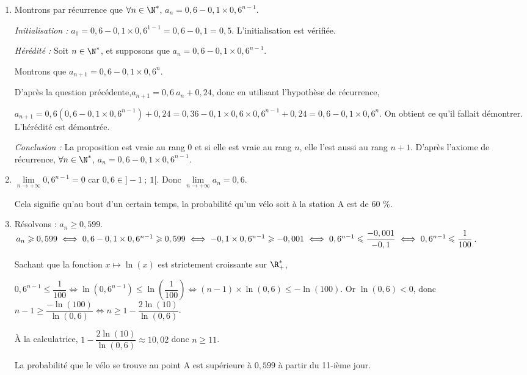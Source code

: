 \begin{enumerate}
\begin{enumerate}
		Donc $\forall n\in \N^*$, $a_{n+1}=0,84~a_n+0,24(1-a_n)=0,6~a_n+0,24$
		\item Montrons par récurrence que $\forall n \in \N^*$, $a_n = 0,6 - 0,1 \times 0,6^{n - 1}$.
						
		\textit{Initialisation :} $a_1=0,6 - 0,1 \times 0,6^{1 - 1}=0,6-0,1=0,5$. L'initialisation est vérifiée.
				
		\textit{Hérédité :} Soit  $n \in \N^*$, et supposons que $a_n = 0,6 - 0,1 \times 0,6^{n - 1}$.
		
		Montrons que $a_{n+1} = 0,6 - 0,1 \times 0,6^{n}$.
				
		D'après la question précédente,$a_{n+1}=0,6~a_n+0,24$, donc en utilisant l'hypothèse de récurrence,
		
		$a_{n+1}=0,6\left(0,6 - 0,1 \times 0,6^{n - 1}\right)+0,24=0,36-0,1\times0,6 \times0,6^{n - 1}+0,24=0,6-0,1\times 0,6^n $. On obtient ce qu'il fallait démontrer. L'hérédité est démontrée.
				
		\textit{Conclusion : }  La proposition est vraie au rang $0$ et si elle est vraie au rang $n$, elle l'est aussi au rang $n + 1$.	D'après l'axiome de récurrence, $\forall n \in \N^*$, $a_n = 0,6 - 0,1 \times 0,6^{n - 1}$.
		\item $\displaystyle\lim\limits_{n \rightarrow +\infty} 0,6^{n-1}=0$ car $0,6\in ]-1~;~1[$. Donc $\displaystyle\lim\limits_{n \rightarrow +\infty} a_n=0,6$.
		
		Cela signifie qu'au bout d'un certain temps, la probabilité qu'un vélo soit à la station A est de 60 \%.
		\item Résolvons : $a_n\geqslant 0,599$.
		$a_n\geqslant 0,599\iff  0,6 - 0,1 \times 0,6^{n - 1} \geqslant 0,599 \\
		\iff - 0,1 \times 0,6^{n - 1} \geqslant -0,001 \iff 0,6^{n - 1} \leqslant \dfrac{-0,001}{-0,1} \iff 0,6^{n - 1} \leqslant \dfrac{1}{100} $.
		
		Sachant que la fonction $x\mapsto\ln(x)$ est strictement croissante sur $\R_+^*$, 
		
		$0,6^{n - 1} \leqslant \dfrac{1}{100} \iff \ln\left(0,6^{n - 1} \right) \leqslant \ln\left(\dfrac{1}{100}\right) \iff (n-1)\times \ln(0,6) \leqslant -\ln(100)$. Or $\ln(0,6)<0$, donc
		$n-1 \geqslant \dfrac{-\ln(100)}{\ln(0,6)} \iff n \geqslant 1-\dfrac{2\ln(10)}{\ln(0,6)}$.
		
		À la calculatrice, $1-\dfrac{2\ln(10)}{\ln(0,6)}\approx 10,02$ donc $n\geqslant 11$.
		
		La probabilité que le vélo se trouve au point A est supérieure à $0,599$ à partir du 11-ième jour.
		\end{enumerate}
\end{enumerate}

\bigskip

